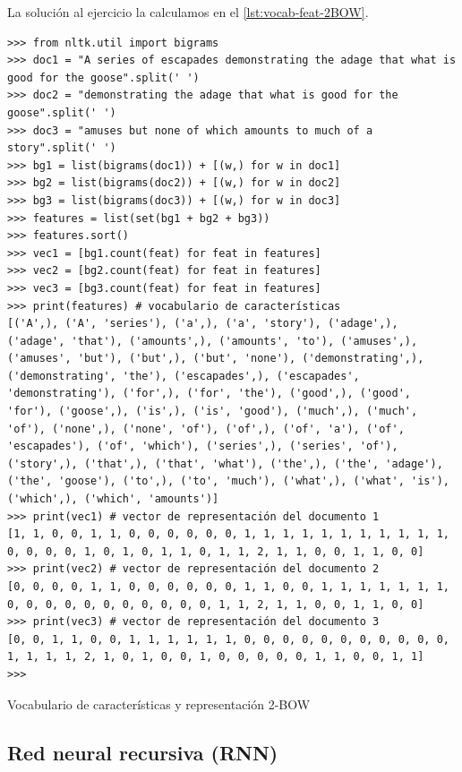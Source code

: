 La solución al ejercicio la calculamos en el \autoref{lst:vocab-feat-2BOW}.

\begin{listing}[htbp]
\begin{verbatim}
>>> from nltk.util import bigrams
>>> doc1 = "A series of escapades demonstrating the adage that what is good for the goose".split(' ')
>>> doc2 = "demonstrating the adage that what is good for the goose".split(' ')
>>> doc3 = "amuses but none of which amounts to much of a story".split(' ')
>>> bg1 = list(bigrams(doc1)) + [(w,) for w in doc1]
>>> bg2 = list(bigrams(doc2)) + [(w,) for w in doc2]
>>> bg3 = list(bigrams(doc3)) + [(w,) for w in doc3]
>>> features = list(set(bg1 + bg2 + bg3))
>>> features.sort()
>>> vec1 = [bg1.count(feat) for feat in features]
>>> vec2 = [bg2.count(feat) for feat in features]
>>> vec3 = [bg3.count(feat) for feat in features]
>>> print(features) # vocabulario de características
[('A',), ('A', 'series'), ('a',), ('a', 'story'), ('adage',), ('adage', 'that'), ('amounts',), ('amounts', 'to'), ('amuses',), ('amuses', 'but'), ('but',), ('but', 'none'), ('demonstrating',), ('demonstrating', 'the'), ('escapades',), ('escapades', 'demonstrating'), ('for',), ('for', 'the'), ('good',), ('good', 'for'), ('goose',), ('is',), ('is', 'good'), ('much',), ('much', 'of'), ('none',), ('none', 'of'), ('of',), ('of', 'a'), ('of', 'escapades'), ('of', 'which'), ('series',), ('series', 'of'), ('story',), ('that',), ('that', 'what'), ('the',), ('the', 'adage'), ('the', 'goose'), ('to',), ('to', 'much'), ('what',), ('what', 'is'), ('which',), ('which', 'amounts')]
>>> print(vec1) # vector de representación del documento 1
[1, 1, 0, 0, 1, 1, 0, 0, 0, 0, 0, 0, 1, 1, 1, 1, 1, 1, 1, 1, 1, 1, 1, 0, 0, 0, 0, 1, 0, 1, 0, 1, 1, 0, 1, 1, 2, 1, 1, 0, 0, 1, 1, 0, 0]
>>> print(vec2) # vector de representación del documento 2
[0, 0, 0, 0, 1, 1, 0, 0, 0, 0, 0, 0, 1, 1, 0, 0, 1, 1, 1, 1, 1, 1, 1, 0, 0, 0, 0, 0, 0, 0, 0, 0, 0, 0, 1, 1, 2, 1, 1, 0, 0, 1, 1, 0, 0]
>>> print(vec3) # vector de representación del documento 3
[0, 0, 1, 1, 0, 0, 1, 1, 1, 1, 1, 1, 0, 0, 0, 0, 0, 0, 0, 0, 0, 0, 0, 1, 1, 1, 1, 2, 1, 0, 1, 0, 0, 1, 0, 0, 0, 0, 0, 1, 1, 0, 0, 1, 1]
>>> 
\end{verbatim}
\caption{Vocabulario de características y representación 2-BOW}
\label{lst:vocab-feat-2BOW}
\end{listing}


\subsection{Red neural recursiva (RNN)} 

